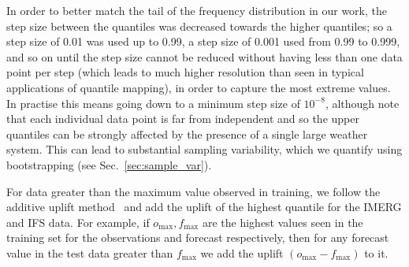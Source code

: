 \documentclass{article}
\begin{document}
In order to better match the tail of the frequency distribution in our work, the step size between the quantiles was decreased towards the higher quantiles; so a step size of 0.01 was used up to 0.99, a step size of 0.001 used from 0.99 to 0.999, and so on until the step size cannot be reduced without having less than one data point per step (which leads to much higher resolution than seen in typical applications of quantile mapping), in order to capture the most extreme values. In practise this means going down to a minimum step size of $10^{-8}$, although note that each individual data point is far from independent and so the upper quantiles can be strongly affected by the presence of a single large weather system. This can lead to substantial sampling variability, which we quantify using bootstrapping (see Sec.~\ref{sec:sample_var}).



For data greater than the maximum value observed in training, we follow the additive uplift method~\citep{boe_statistical_2007, deque_frequency_2007} and add the uplift of the highest quantile for the IMERG and IFS data. For example, if $o_{\text{max}},f_{\text{max}}$ are the highest values seen in the training set for the observations and forecast respectively, then for any forecast value in the test data greater than $f_{\text{max}}$ we add the uplift $(o_{\text{max}} - f_{\text{max}})$ to it. 
\end{document}
